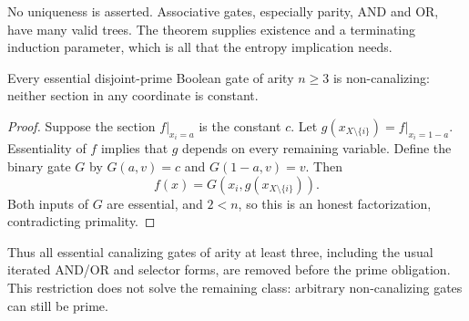No uniqueness is asserted.  Associative gates, especially parity, AND and
OR, have many valid trees.  The theorem supplies existence and a terminating
induction parameter, which is all that the entropy implication needs.

\begin{proposition}
Every essential disjoint-prime Boolean gate of arity $n\ge3$ is
non-canalizing: neither section in any coordinate is constant.
\end{proposition}

\begin{proof}
Suppose the section $f|_{x_i=a}$ is the constant $c$.  Let
$g(x_{X\setminus\{i\}})=f|_{x_i=1-a}$.  Essentiality of $f$ implies that
$g$ depends on every remaining variable.  Define the binary gate $G$ by
$G(a,v)=c$ and $G(1-a,v)=v$.  Then
\[
 f(x)=G(x_i,g(x_{X\setminus\{i\}})).
\]
Both inputs of $G$ are essential, and $2<n$, so this is an honest
factorization, contradicting primality.
\end{proof}

Thus all essential canalizing gates of arity at least three, including the
usual iterated AND/OR and selector forms, are removed before the prime
obligation.  This restriction does not solve the remaining class: arbitrary
non-canalizing gates can still be prime.
